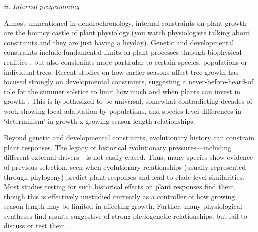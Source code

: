 \documentclass[11pt]{article}
\begin{document}
\emph{ii. Internal programming}

Almost unmentioned in dendrochronology, internal constraints on plant growth are the bouncy castle of plant physiology (you watch physiologists talking about constraints and they are just having a heyday). Genetic and developmental constraints include fundamental limits on plant processes through biophysical realities \citep[e.g., allometry, chemical reaction limits, and genetic architecture that may limit what trait combinations are possible,][]{ackerly2000evolution}, but also constraints more particular to certain species, populations or individual trees. Recent studies on how earlier seasons affect tree growth has focused strongly on developmental constraints, suggesting a never-before-heard-of role for the summer solstice to limit how much and when plants can invest in growth \citep{zohner2023effect}. This is hypothesized to be universal, somewhat contradicting decades of work showing local adaptation by populations, and species-level differences in `determinism' in growth x growing season length relationships. 

Beyond genetic and developmental constraints, evolutionary history can constrain plant responses. The legacy of historical evolutionary pressures---including different external drivers---is not easily erased.  Thus, many species show evidence of previous selection, seen when evolutionary relationships (usually represented through phylogeny) predict plant responses and lead to clade-level similarities. Most studies testing for such historical effects on plant responses find them, though this is effectively unstudied currently as a controller of how growing season length may be limited in affecting growth. Further, many physiological syntheses find results suggestive of strong phylogenetic relationships, but fail to discuss or test them \citep[e.g., discussions of evergreen versus deciduous phenology without testing for whether this is actually correlated with the deep in time split between gymnosperms and angiosperms,][]{way2010differential}. 
\end{document}
